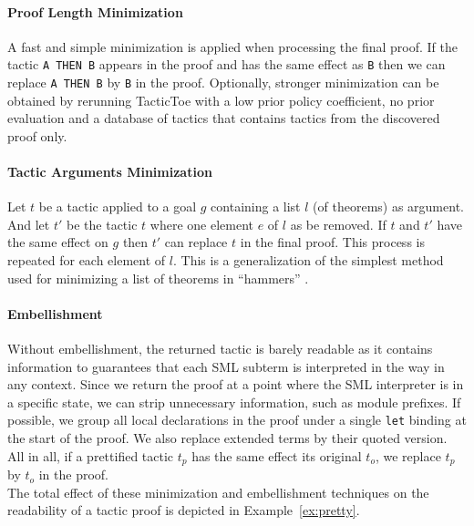 \documentclass[runningheads,a4paper,draft]{svjour3}
\def\sml{\textsf{SML}\xspace}
\def\tactictoe{\textsf{TacticToe}\xspace}
\begin{document}
\paragraph{Proof Length Minimization}
A fast and simple minimization is applied when processing the final proof. If
the tactic \texttt{A THEN B} appears in the proof and has the same effect as
\texttt{B} then we can replace \texttt{A THEN B} by \texttt{B} in the proof.
Optionally, stronger minimization can be obtained
by rerunning \tactictoe with a low prior
policy coefficient, no prior evaluation and a database of tactics that contains
tactics from the discovered proof only.

\paragraph{Tactic Arguments Minimization}
Let $t$ be a tactic applied to a goal $g$ containing a list $l$ (of theorems)
as argument. And let $t'$ be the tactic $t$ where one element $e$ of $l$ as be
removed. If $t$ and $t'$ have the same effect on $g$ then $t'$ can replace $t$
in the final proof. This process is repeated for each element of $l$.
This is a generalization of the simplest method used for minimizing a list of
theorems in ``hammers'' \cite{hammers4qed}.

\paragraph{Embellishment}
Without embellishment, the returned tactic is barely readable as it contains
information to guarantees that each \sml subterm is interpreted in the way in
any context. Since we return the proof at a point where the \sml interpreter is
in a specific state, we can strip unnecessary information, such as
module prefixes. If possible, we group all local declarations in the
proof under a single \texttt{let} binding at the start of the proof. We
also replace extended terms by their quoted version.
All in all, if a prettified tactic $t_p$ has the same effect its original
$t_o$, we replace $t_p$ by $t_o$ in the proof.\\

The total effect of these minimization and embellishment techniques
on the readability of a tactic proof is depicted in
Example~\ref{ex:pretty}.
\end{document}
